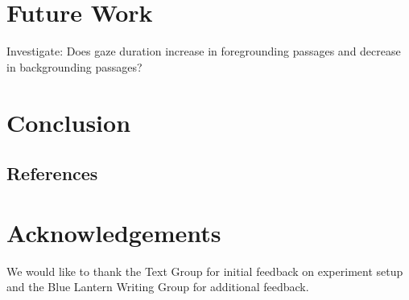 \documentclass[11pt]{article}
\begin{document}
\section{Future Work}

Investigate: Does gaze duration increase in foregrounding passages and decrease in backgrounding passages?

\section{Conclusion}


\subsection{References}

\nocite{Green2004,liwc_22,kuzmicova2014,brysbaert2014,chung-fat-yim_cilento_piotrowska_mar_2019,Maslej2019TheTF,boyd_blackburn_pennebaker_2020,green_brock_kaufman_2006,kasunic_kaufman_2018,Consoli2018,busselle2009,jacobs2018,jacobs2017,stockwell2002cognitive,HSU201596,willems_2015,mak2019,kunze2015,ferreira-goncalo-oliveira-2018-seeking,rashkin-etal-2016-connotation,aryani2013,delatorre2019,andrade2020,indico2015}





\section*{Acknowledgements}

We would like to thank the Text Group for initial feedback on experiment setup and the Blue Lantern Writing Group for additional feedback.
\end{document}
